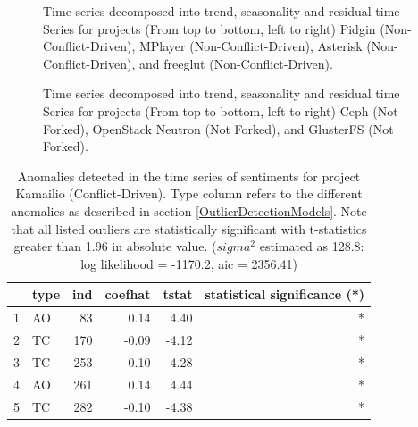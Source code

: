 \documentclass[12pt,letterpaper]{gthesis2}  %
\begin{document}
\begin{figure}[!htbp]
\hspace{6ex}
\vspace{6ex}
\vspace{6ex}
\hspace{6ex}
\vspace{4ex}
\caption{Time series decomposed into trend, seasonality and residual time Series for projects (From top to bottom, left to right) Pidgin (Non-Conflict-Driven), MPlayer (Non-Conflict-Driven), Asterisk (Non-Conflict-Driven), and freeglut (Non-Conflict-Driven).}
\label{figureDecpmposed_5to8}
\end{figure}

\begin{figure}[!htbp]
\hspace{6ex}
\vspace{6ex}
\vspace{6ex}
\hspace{6ex}
\caption{Time series decomposed into trend, seasonality and residual time Series for projects (From top to bottom, left to right) Ceph (Not Forked), OpenStack Neutron (Not Forked), and GlusterFS (Not Forked).}
\label{figureDecpmposed_9to12}
\end{figure}

\pagebreak

\begin{table} [!htbp]
\centering
\caption{Anomalies detected in the time series of sentiments for project Kamailio (Conflict-Driven). Type column refers to the different anomalies as described in section \ref{OutlierDetectionModels}. Note that all listed outliers are statistically significant with t-statistics greater than 1.96 in absolute value. ($sigma^2$ estimated as 128.8:  log likelihood = -1170.2,  aic = 2356.41)}
\label{AnomaliesKamailio}
\begin{tabular}{rlrrrr}
  \hline
 & type & ind & coefhat & tstat & statistical significance (*) \\ 
  \hline
  1 & AO &  83 & 0.14 & 4.40 & * \\ 
  2 & TC & 170 & -0.09 & -4.12 & *\\ 
  3 & TC & 253 & 0.10 & 4.28  & *\\ 
  4 & AO & 261 & 0.14 & 4.44  & *\\ 
  5 & TC & 282 & -0.10 & -4.38 &  * \\ 
   \hline
\end{tabular}
\end{table}
\end{document}
